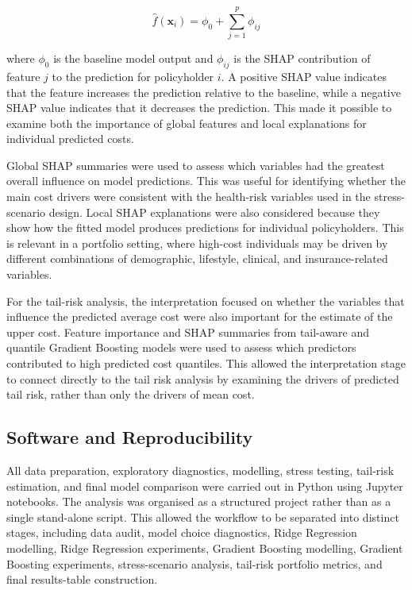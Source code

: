 	\begin{equation}
		\hat{f}(\mathbf{x}_i)
		=
		\phi_0
		+
		\sum_{j=1}^{p}
		\phi_{ij}
	\end{equation}
	
	where \(\phi_0\) is the baseline model output and \(\phi_{ij}\) is the SHAP contribution of feature \(j\) to the prediction for policyholder \(i\). A positive SHAP value indicates that the feature increases the prediction relative to the baseline, while a negative SHAP value indicates that it decreases the prediction. This made it possible to examine both the importance of global features and local explanations for individual predicted costs.
	
	Global SHAP summaries were used to assess which variables had the greatest overall influence on model predictions. This was useful for identifying whether the main cost drivers were consistent with the health-risk variables used in the stress-scenario design. Local SHAP explanations were also considered because they show how the fitted model produces predictions for individual policyholders. This is relevant in a portfolio setting, where high-cost individuals may be driven by different combinations of demographic, lifestyle, clinical, and insurance-related variables.
	
	For the tail-risk analysis, the interpretation focused on whether the variables that influence the predicted average cost were also important for the estimate of the upper cost. Feature importance and SHAP summaries from tail-aware and quantile Gradient Boosting models were used to assess which predictors contributed to high predicted cost quantiles. This allowed the interpretation stage to connect directly to the tail risk analysis by examining the drivers of predicted tail risk, rather than only the drivers of mean cost.

	\subsection{Software and Reproducibility}
	
	All data preparation, exploratory diagnostics, modelling, stress testing, tail-risk estimation, and final model comparison were carried out in Python using Jupyter notebooks. The analysis was organised as a structured project rather than as a single stand-alone script. This allowed the workflow to be separated into distinct stages, including data audit, model choice diagnostics, Ridge Regression modelling, Ridge Regression experiments, Gradient Boosting modelling, Gradient Boosting experiments, stress-scenario analysis, tail-risk portfolio metrics, and final results-table construction.
	

